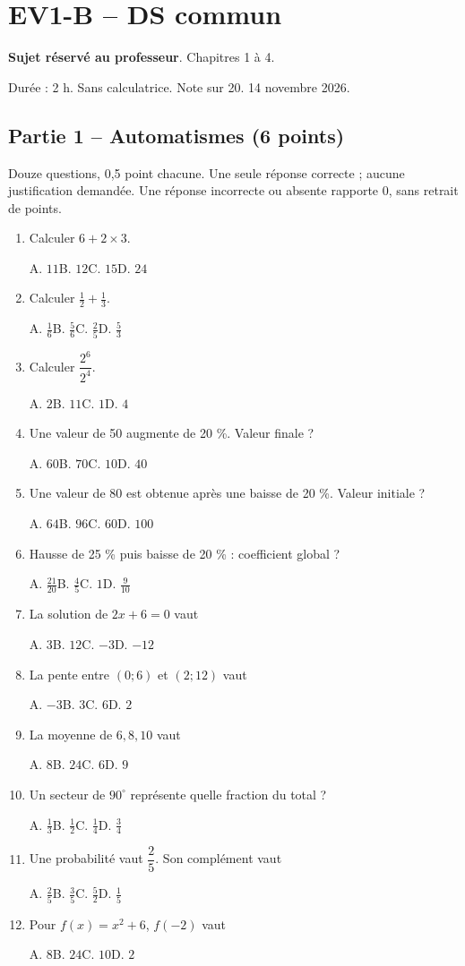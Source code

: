 \clearpage\section*{EV1-B -- DS commun}\label{EV1-B}
\textbf{Sujet réservé au professeur}. Chapitres 1 à 4.\par Durée : 2 h. Sans calculatrice. Note sur 20. 14 novembre 2026.
\subsection*{Partie 1 -- Automatismes (6 points)}
Douze questions, 0,5 point chacune. Une seule réponse correcte ; aucune justification demandée. Une réponse incorrecte ou absente rapporte 0, sans retrait de points.
\begin{enumerate}
\item Calculer $6+2\times3$.\par A. $11$\quad B. $12$\quad C. $15$\quad D. $24$
\item Calculer $\frac12+\frac13$.\par A. $\frac{1}{6}$\quad B. $\frac{5}{6}$\quad C. $\frac{2}{5}$\quad D. $\frac{5}{3}$
\item Calculer $\dfrac{2^6}{2^{4}}$.\par A. $2$\quad B. $11$\quad C. $1$\quad D. $4$
\item Une valeur de 50 augmente de 20 \%. Valeur finale ?\par A. $60$\quad B. $70$\quad C. $10$\quad D. $40$
\item Une valeur de 80 est obtenue après une baisse de 20 \%. Valeur initiale ?\par A. $64$\quad B. $96$\quad C. $60$\quad D. $100$
\item Hausse de 25 \% puis baisse de 20 \% : coefficient global ?\par A. $\frac{21}{20}$\quad B. $\frac{4}{5}$\quad C. $1$\quad D. $\frac{9}{10}$
\item La solution de $2x+6=0$ vaut\par A. $3$\quad B. $12$\quad C. $-3$\quad D. $-12$
\item La pente entre $(0;6)$ et $(2;12)$ vaut\par A. $-3$\quad B. $3$\quad C. $6$\quad D. $2$
\item La moyenne de $6, 8, 10$ vaut\par A. $8$\quad B. $24$\quad C. $6$\quad D. $9$
\item Un secteur de $90^\circ$ représente quelle fraction du total ?\par A. $\frac{1}{3}$\quad B. $\frac{1}{2}$\quad C. $\frac{1}{4}$\quad D. $\frac{3}{4}$
\item Une probabilité vaut $\dfrac{2}{5}$. Son complément vaut\par A. $\frac{2}{5}$\quad B. $\frac{3}{5}$\quad C. $\frac{5}{2}$\quad D. $\frac{1}{5}$
\item Pour $f(x)=x^2+6$, $f(-2)$ vaut\par A. $8$\quad B. $24$\quad C. $10$\quad D. $2$
\end{enumerate}
